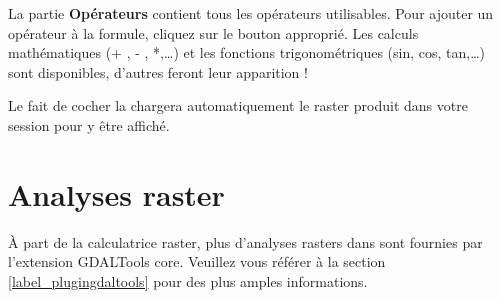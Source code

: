 La partie \textbf{Opérateurs} contient tous les opérateurs utilisables. Pour ajouter un opérateur à la formule, cliquez sur le bouton approprié. Les calculs mathématiques (+ , - , *,\dots) et les fonctions trigonométriques (sin, cos, tan,\dots) sont disponibles, d'autres feront leur apparition !

Le fait de cocher la  chargera automatiquement le raster produit dans votre session pour y être affiché.

\section{Analyses raster}\label{sec:raster_analysis}
À part de la calculatrice raster, plus d'analyses rasters dans  sont fournies par l'extension GDALTools core. Veuillez vous référer à la section \ref{label_plugingdaltools} pour des plus amples informations.

  \FloatBarrier
